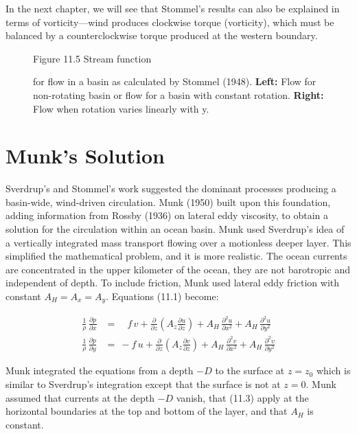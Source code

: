 In the next chapter, we will see that Stommel's results can also be
explained in terms of vorticity---wind produces clockwise torque (vorticity),
which must be balanced by a counterclockwise torque produced at the western
boundary.

\begin{figure}[h!]
\footnotesize
Figure 11.5 Stream function \rule{0pt}{3ex}for flow in a basin as calculated by
Stommel (1948).
\textbf{Left:} Flow for non-rotating basin or flow for a basin with constant
rotation. \textbf{Right:} Flow when rotation varies linearly with y.
\label{fig:stommelcurrents}
\vspace{-3ex}
\end{figure}

\section{Munk's Solution}
Sverdrup's and Stommel's work suggested the
dominant processes producing  a basin-wide, wind-driven circulation. Munk (1950)
built upon this foundation, adding information from Rossby (1936) on lateral eddy
viscosity, to obtain a solution for the circulation within an ocean basin. Munk
used Sverdrup's idea of a vertically integrated mass transport flowing over a
motionless deeper layer. This simplified the mathematical problem, and it is more
realistic. The ocean currents are concentrated in the upper kilometer of the ocean,
they are not barotropic and independent of depth. To include friction, Munk used
lateral eddy friction with constant $A_H = A_x = A_y$. Equations (11.1) become:

\begin{subequations}
\begin{align}
\frac{1}{\rho}\, \frac{\partial{p}}{\partial{x}}
&=\quad f \,v+\frac{\partial}{\partial{z}}\left(A_z
\frac{\partial{u}}{\partial{z}}\right) + A_H\,
\frac{\partial^2{u}}{\partial{x}^2} + A_H\, \frac{\partial^2{u}}{\partial{y}^2} \\
\frac{1}{\rho}\, \frac{\partial{p}}{\partial{y}} &=\:-f \,u+\frac{\partial}{\partial{z}}\left(A_z
\frac{\partial{v}}{\partial{z}}\right) + A_H\, \frac{\partial^2{v}}{\partial{x}^2} + A_H\,
\frac{\partial^2{v}}{\partial{y}^2}
\end{align}
\end{subequations}

Munk integrated the equations from a depth $-D$ to the surface at $z = z_0$ which
is similar to Sverdrup's integration except that the surface is not at $z = 0$.
Munk assumed that currents at the depth $-D$ vanish, that (11.3) apply at the
horizontal boundaries at the top and bottom of the layer, and that $A_H$ is
constant.

